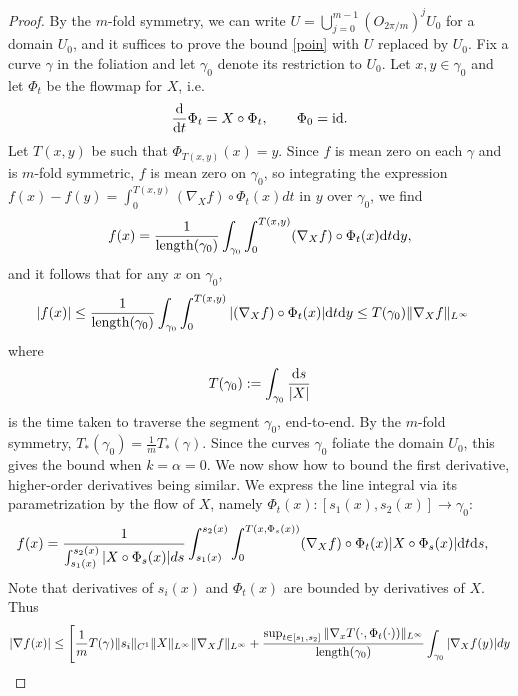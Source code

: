 \documentclass[11pt]{article}
\theoremstyle{plain}
\numberwithin{equation}{section}
\theoremstyle{remark}
\newcommand{\rmd}{{\rm d}}
\newcommand{\be}{\begin{equation}}
\newcommand{\ee}{\end{equation}}
\begin{document}
\begin{proof}

    By the $m$-fold symmetry, we can write $U = \bigcup_{j = 0}^{m-1} (O_{2\pi/m})^j U_0$
    for a domain $U_0$, and it suffices
    to prove the bound \eqref{poin} with $U$ replaced by $U_0$. Fix a curve
    $\gamma$ in the foliation and let $\gamma_0$ denote its restriction to $U_0$. Let $x,y\in \gamma_0$ and let $\Phi_t$ be the flowmap for $X$, i.e.
$$
\frac{\rmd }{\rmd t} \Phi_t = X\circ \Phi_t , \qquad \Phi_0={\rm id}.
$$
Let $T(x,y)$ be such that $\Phi_{T(x,y)}(x) = y$. 
Since $f$ is mean zero on each $\gamma$ and is $m$-fold symmetric,
    $f$ is mean zero on $\gamma_0$, so
integrating the expression $f(x)- f(y) =\int_0^{T(x,y)} (\nabla_X  f)\circ \Phi_t(x) d t$
in $y$ over $\gamma_0$, we find
\begin{equation} \label{finvform}
f(x) = \frac{1}{{\rm length}(\gamma_0)}\int_{\gamma_0}\int_0^{T(x,y)} (\nabla_X  f)\circ \Phi_t(x) \rmd t \rmd y,
\end{equation}
and it follows that for any $x$ on $\gamma_0$,
\begin{align*}
|f(x)| \leq \frac{1}{{\rm length}(\gamma_0)}\int_{\gamma_0}\int_0^{T(x,y)} |(\nabla_X  f)\circ \Phi_t(x)| \rmd t \rmd y 
&\leq  T(\gamma_0)\| \nabla_X f\|_{L^\infty}
\end{align*}
where 
\be
T(\gamma_0):=  \int_{\gamma_0} \frac{\rmd s}{|X|}
\ee
is the time taken to traverse the segment $\gamma_0$, end-to-end. By the $m$-fold
symmetry, $T_*(\gamma_0)
= \frac{1}{m}T_*(\gamma)$. Since the curves $\gamma_0$
foliate the domain $U_0$, this gives the bound when
$k = \alpha = 0$. We now show how to bound the first derivative, higher-order derivatives
being similar.  We express the line integral via its parametrization by the flow of $X$, namely $\Phi_t(x):[s_1(x),s_2(x)] \to \gamma_0$:
\begin{align}
f(x) &= \frac{1}{\int_{s_1(x)}^{s_2(x)} |X\circ \Phi_s(x)|  ds}\int_{s_1(x)}^{s_2(x)} \int_0^{T(x,\Phi_s(x))} (\nabla_X  f)\circ \Phi_t(x) |X\circ \Phi_s(x)| \rmd t \rmd s,
\end{align}
Note that derivatives of $s_i(x)$ and $\Phi_t(x)$ are bounded by derivatives of $X$.  Thus
\begin{align*}
|\nabla f(x)| &\leq  \Bigg[\frac{1}{m} T(\gamma) \|s_i\|_{C^1} \|X\|_{L^\infty} \|\nabla_X  f\|_{L^\infty}  +\frac{\sup_{t\in [s_1,s_2]}\|\nabla_x T(\cdot,\Phi_t (\cdot) )\|_{L^\infty}}{{\rm length}(\gamma_0)} \int_{\gamma_0}|\nabla_X  f(y)| d y \\

\end{align*}
\end{proof}
\end{document}
